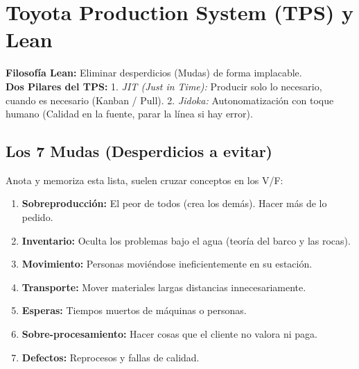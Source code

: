 \section{Toyota Production System (TPS) y Lean}

\begin{tcolorbox}[colback=red!5!white,colframe=red!75!black,title=Mapa Mental Rápido (Cópialo)]
\textbf{Filosofía Lean:} Eliminar desperdicios (Mudas) de forma implacable.\\
\textbf{Dos Pilares del TPS:} 
1. \textit{JIT (Just in Time):} Producir solo lo necesario, cuando es necesario (Kanban / Pull).
2. \textit{Jidoka:} Autonomatización con toque humano (Calidad en la fuente, parar la línea si hay error).
\end{tcolorbox}

\subsection{Los 7 Mudas (Desperdicios a evitar)}
Anota y memoriza esta lista, suelen cruzar conceptos en los V/F:
\begin{enumerate}
    \item \textbf{Sobreproducción:} El peor de todos (crea los demás). Hacer más de lo pedido.
    \item \textbf{Inventario:} Oculta los problemas bajo el agua (teoría del barco y las rocas).
    \item \textbf{Movimiento:} Personas moviéndose ineficientemente en su estación.
    \item \textbf{Transporte:} Mover materiales largas distancias innecesariamente.
    \item \textbf{Esperas:} Tiempos muertos de máquinas o personas.
    \item \textbf{Sobre-procesamiento:} Hacer cosas que el cliente no valora ni paga.
    \item \textbf{Defectos:} Reprocesos y fallas de calidad.
\end{enumerate}

